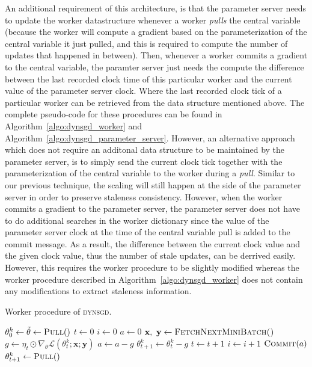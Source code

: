 An additional requirement of this architecture, is that the parameter server needs to update the worker datastructure whenever a worker \emph{pulls} the central variable (because the worker will compute a gradient based on the parameterization of the central variable it just pulled, and this is required to compute the number of updates that happened in between). Then, whenever a worker commits a gradient to the central variable, the paramter server just needs the compute the difference between the last recorded clock time of this particular worker and the current value of the parameter server clock. Where the last recorded clock tick of a particular worker can be retrieved from the data structure mentioned above. The complete pseudo-code for these procedures can be found in Algorithm~\ref{algo:dynsgd_worker} and Algorithm~\ref{algo:dynsgd_parameter_server}. However, an alternative approach which does not require an additonal data structure to be maintained by the parameter server, is to simply send the current clock tick together with the parameterization of the central variable to the worker during a \emph{pull}. Similar to our previous technique, the scaling will still happen at the side of the parameter server in order to preserve staleness consistency. However, when the worker commits a gradient to the parameter server, the parameter server does not have to do additional searches in the worker dictionary since the value of the parameter server clock at the time of the central variable pull is added to the commit message. As a result, the difference between the current clock value and the given clock value, thus the number of stale updates, can be derrived easily. However, this requires the worker procedure to be slightly modified whereas the worker procedure described in Algorithm~\ref{algo:dynsgd_worker} does not contain any modifications to extract staleness information.

\begin{algorithm}[H]
  \caption{Worker procedure of \textsc{dynsgd}.}
  \label{algo:dynsgd_worker}
  \begin{algorithmic}[1]
    \State $\theta^k_0 \gets \tilde{\theta} \gets \Call{Pull}$
    \State $t \gets 0$
    \State $i \gets 0$
    \State $a \gets 0$
    \State $\textbf{x},~\textbf{y} \gets \Call{FetchNextMiniBatch()}{}$
    \State $g \gets \eta_t \odot \nabla_\theta \mathcal{L}(\theta^k_t;\textbf{x};\textbf{y})$
    \State $a \gets a - g$
    \State $\theta^k_{t+1} \gets \theta^k_t - g$
    \State $t \gets t + 1$
    \State $i \gets i + 1$
    \EndWhile
    \State $\Call{Commit}{a}$
    \State $\theta^k_{t + 1} \gets \Call{Pull}$
    \EndWhile
    \EndProcedure
  \end{algorithmic}
\end{algorithm}

